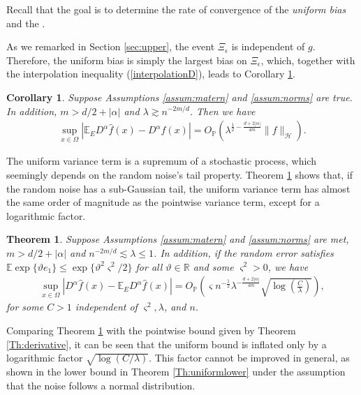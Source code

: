 \documentclass[12pt]{article}
\theoremstyle{plain}
\newtheorem{theorem}{Theorem}
\newtheorem{corollary}{Corollary}
\theoremstyle{remark}
\begin{document}
Recall that the goal is to determine the rate of convergence of the \textit{uniform bias} and the .

As we remarked in Section \ref{sec:upper}, the event $\Xi_\epsilon$ is independent of $g$. Therefore, the uniform bias is simply the largest bias on $\Xi_\epsilon$, which, together with the interpolation inequality (\ref{interpolationD}), leads to Corollary \ref{Coro:uniformbias}.


\begin{corollary}\label{Coro:uniformbias}
    Suppose Assumptions \ref{assum:matern} and \ref{assum:norms} are true. In addition, $m>d/2+|\alpha|$ and $\lambda\gtrsim n^{-2m/d}$. Then we have
    \begin{eqnarray}\label{uniformbias}
        \sup_{x\in\Omega}\left|\mathbb{E}_E D^\alpha \hat{f}(x)-D^\alpha f(x)\right|=O_\mathbb{P}(\lambda^{\frac{1}{2}-\frac{d+2|\alpha|}{4m}}\|f\|_\mathcal{H}).
    \end{eqnarray}
\end{corollary}
The uniform variance term is a supremum of a stochastic process, which seemingly depends on the random noise's tail property. Theorem \ref{Th:uniformvar} shows that, if the random noise has a sub-Gaussian tail, the uniform variance term has almost the same order of magnitude as the pointwise variance term, except for a logarithmic factor. 

\begin{theorem}\label{Th:uniformvar}
    Suppose Assumptions \ref{assum:matern} and \ref{assum:norms} are met, $m>d/2+|\alpha|$ and $n^{-2m/d}\lesssim\lambda\leq 1$.
    In addition, if the random error satisfies $\mathbb{E}\exp\{\vartheta e_1\}\leq \exp\{\vartheta^2\varsigma^2/2\}$ for all $\vartheta\in \mathbb{R}$ and some $\varsigma^2>0$, we have
    \begin{eqnarray}\label{uniformvarsubgaussian}
        \sup_{x\in\Omega}\left|D^\alpha \hat{f}(x)-\mathbb{E}_E D^\alpha \hat{f}(x)\right|= O_\mathbb{P}\left(\varsigma n^{-\frac{1}{2}}\lambda^{-\frac{d+2|\alpha|}{4m}}\sqrt{\log\left(\frac{C}{\lambda}\right)}\right),
    \end{eqnarray}
    for some $C>1$ independent of $\varsigma^2,\lambda$, and $n$.
\end{theorem}

Comparing Theorem \ref{Th:uniformvar} with the pointwise bound given by Theorem \ref{Th:derivative}, it can be seen that the uniform bound is inflated only by a logarithmic factor $\sqrt{\log(C/\lambda)}$. This factor cannot be improved in general, as shown in the lower bound in Theorem \ref{Th:uniformlower} under the assumption that the noise follows a normal distribution.
\end{document}
